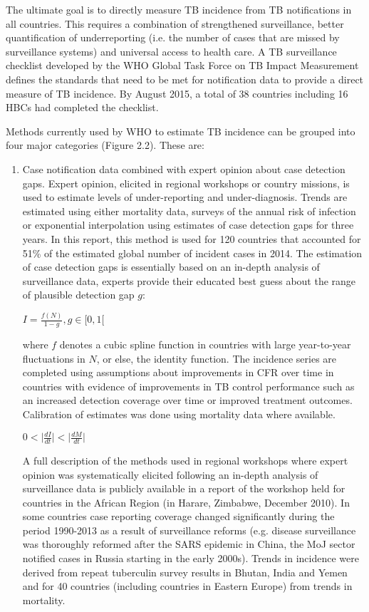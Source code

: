 The ultimate goal is to directly measure TB incidence from TB notifications in all countries. This requires a combination of strengthened surveillance, better quantification of underreporting (i.e. the number of cases that are missed by surveillance systems) and universal access to health care. A TB surveillance checklist developed by the WHO Global Task Force on TB Impact Measurement defines the standards that need to be met for notification data to provide a direct measure of TB incidence. By August 2015, a total of 38 countries including 16 HBCs had completed the checklist.

 Methods currently used by WHO to estimate TB incidence can be grouped into four major categories (Figure 2.2). These are: 

\begin{enumerate}
\item {Case notification data combined with expert opinion about case detection gaps.} Expert opinion, elicited in regional workshops or country missions, is used to estimate levels of under-reporting and under-diagnosis. Trends are estimated using either mortality data, surveys of the annual risk of infection or exponential interpolation using estimates of case detection gaps for three years. In this report, this method is used for 120 countries that accounted for 51\% of the estimated global number of incident cases in 2014. The estimation of case detection gaps is essentially based on an in-depth analysis of surveillance data, experts provide their educated best guess about the range of plausible detection gap $g$:

$I=\frac{f(N)}{1-g}, g\in[0,1[$

where $f$ denotes a cubic spline function in countries with large year-to-year fluctuations in $N$, or else, the identity function. The incidence series are completed using assumptions about improvements in CFR over time in countries with evidence of improvements in TB control performance such as an increased detection coverage over time or improved treatment outcomes. Calibration of estimates was done using mortality data where available. 

$0 < \lvert \frac{dI}{dt} \rvert < \lvert \frac{dM}{dt} \rvert $

A full description of the methods used in regional workshops where expert opinion was systematically elicited following an in-depth analysis of surveillance data is publicly available in a report of the workshop held for countries in the African Region (in Harare, Zimbabwe, December 2010\cite{WHO}). In some countries case reporting coverage changed significantly during the period 1990-2013 as a result of surveillance reforms (e.g. disease surveillance was thoroughly reformed after the SARS epidemic in China, the MoJ sector notified cases in Russia starting in the early 2000s). Trends in incidence were derived from repeat tuberculin survey results in Bhutan, India and Yemen and for 40 countries (including countries in Eastern Europe) from trends in mortality. 


\end{enumerate}
